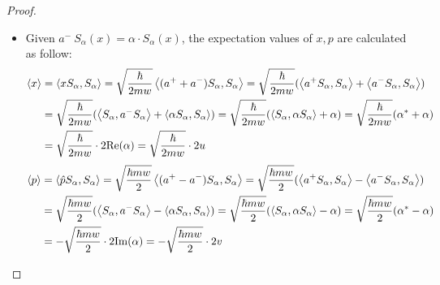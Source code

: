 \documentclass{article}
\begin{document}
\begin{proof}
    \begin{itemize}
        \item[(a)] Given $a^-\ S_\alpha(x)=\alpha \cdot S_\alpha(x)$, the expectation values of $x,p$ are calculated as follow:
        \begin{align}
            \left<x\right>&=\left<xS_\alpha,S_\alpha\right>=\sqrt{\frac{\hbar}{2mw}}\left<(a^++a^-)S_\alpha,S_\alpha\right> = \sqrt{\frac{\hbar}{2mw}}(\left<a^+S_\alpha,S_\alpha\right>+\left<a^- S_\alpha,S_\alpha\right>)\\
            &= \sqrt{\frac{\hbar}{2mw}}(\left<S_\alpha,a^-S_\alpha\right>+\left<\alpha S_\alpha,S_\alpha\right>) = \sqrt{\frac{\hbar}{2mw}}(\left<S_\alpha,\alpha S_\alpha\right>+\alpha) = \sqrt{\frac{\hbar}{2mw}}(\alpha^*+\alpha)\\
            &=\sqrt{\frac{\hbar}{2mw}}\cdot 2\mathrm{Re}(\alpha)=\sqrt{\frac{\hbar}{2mw}}\cdot 2u
        \end{align}
        \begin{align}
            \left<p\right>&=\left<\hat{p}S_\alpha,S_\alpha\right>=\sqrt{\frac{\hbar mw}{2}}\left<(a^+-a^-)S_\alpha,S_\alpha\right>=\sqrt{\frac{\hbar mw}{2}}(\left<a^+ S_\alpha,S_\alpha\right>-\left<a^-S_\alpha,S_\alpha\right>)\\
            &= \sqrt{\frac{\hbar mw}{2}}(\left<S_\alpha,a^-S_\alpha\right>-\left<\alpha S_\alpha,S_\alpha\right>)=\sqrt{\frac{\hbar mw}{2}}(\left<S_\alpha,\alpha S_\alpha\right>-\alpha) = \sqrt{\frac{\hbar mw}{2}}(\alpha^*-\alpha)\\
            &= -\sqrt{\frac{\hbar mw}{2}}\cdot 2\mathrm{Im}(\alpha) = -\sqrt{\frac{\hbar mw}{2}}\cdot 2v
        \end{align}

        \hfil


\end{itemize}
\end{proof}
\end{document}

